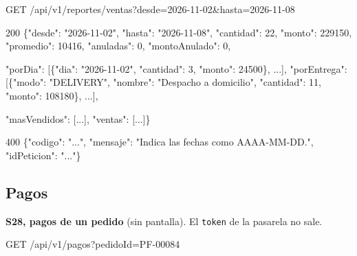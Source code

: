 \begin{codigo}
GET /\allowbreak{}api/\allowbreak{}v1/\allowbreak{}reportes/\allowbreak{}ventas?\allowbreak{}desde=\allowbreak{}2026-\allowbreak{}11-\allowbreak{}02\&\allowbreak{}hasta=\allowbreak{}2026-\allowbreak{}11-\allowbreak{}08\par
\end{codigo}

\begin{codigo}
200 \{"desde":\allowbreak{} "2026-\allowbreak{}11-\allowbreak{}02",\allowbreak{} "hasta":\allowbreak{} "2026-\allowbreak{}11-\allowbreak{}08",\allowbreak{} "cantidad":\allowbreak{} 22,\allowbreak{} "monto":\allowbreak{} 229150,\allowbreak{} "promedio":\allowbreak{} 10416,\allowbreak{} "anuladas":\allowbreak{} 0,\allowbreak{} "montoAnulado":\allowbreak{} 0,\allowbreak{}\par
\hspace*{5\ttw}"porDia":\allowbreak{} [\allowbreak{}\{"dia":\allowbreak{} "2026-\allowbreak{}11-\allowbreak{}02",\allowbreak{} "cantidad":\allowbreak{} 3,\allowbreak{} "monto":\allowbreak{} 24500\},\allowbreak{} .\allowbreak{}.\allowbreak{}.\allowbreak{}],\allowbreak{} "porEntrega":\allowbreak{} [\allowbreak{}\{"modo":\allowbreak{} "DELIVERY",\allowbreak{} "nombre":\allowbreak{} "Despacho a domicilio",\allowbreak{} "cantidad":\allowbreak{} 11,\allowbreak{} "monto":\allowbreak{} 108180\},\allowbreak{} .\allowbreak{}.\allowbreak{}.\allowbreak{}],\allowbreak{}\par
\hspace*{5\ttw}"masVendidos":\allowbreak{} [\allowbreak{}.\allowbreak{}.\allowbreak{}.\allowbreak{}],\allowbreak{} "ventas":\allowbreak{} [\allowbreak{}.\allowbreak{}.\allowbreak{}.\allowbreak{}]\}\par
400 \{"codigo":\allowbreak{} ".\allowbreak{}.\allowbreak{}.\allowbreak{}",\allowbreak{} "mensaje":\allowbreak{} "Indica las fechas como AAAA-\allowbreak{}MM-\allowbreak{}DD.\allowbreak{}",\allowbreak{} "idPeticion":\allowbreak{} ".\allowbreak{}.\allowbreak{}.\allowbreak{}"\}\par
\end{codigo}

\subsection{Pagos}

\textbf{S28, pagos de un pedido} (sin pantalla). El \texttt{token} de la pasarela no sale.


\begin{codigo}
GET /\allowbreak{}api/\allowbreak{}v1/\allowbreak{}pagos?\allowbreak{}pedidoId=\allowbreak{}PF-\allowbreak{}00084\par
\end{codigo}


